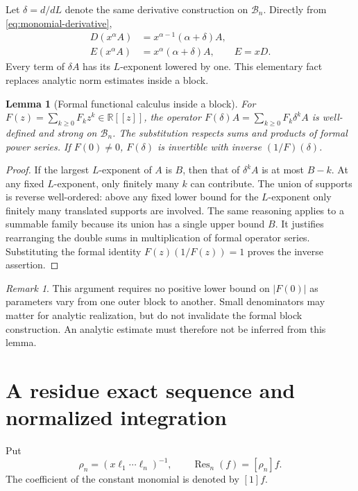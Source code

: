 \documentclass[11pt,a4paper]{article}
\numberwithin{equation}{section}
\newtheorem{lemma}[lemma]{Lemma}
\theoremstyle{definition}
\theoremstyle{remark}
\newtheorem{remark}[remark]{Remark}
\newcommand{\R}{\mathbb R}
\newcommand{\Res}{\operatorname{Res}}
\newcommand{\coef}[2]{[#1]#2}
\begin{document}
Let $\delta=d/dL$ denote the same derivative construction on $\mathcal B_n$. Directly from \eqref{eq:monomial-derivative},
\begin{align}
 D(x^\alpha A)&=x^{\alpha-1}(\alpha+\delta)A,\\
 E(x^\alpha A)&=x^\alpha(\alpha+\delta)A,
 \qquad E=xD.
 \label{eq:euler-block}
\end{align}
Every term of $\delta A$ has its $L$-exponent lowered by one. This elementary fact replaces analytic norm estimates inside a block.

\begin{lemma}[Formal functional calculus inside a block]
\label{lem:functional}
For $F(z)=\sum_{k\ge0}F_kz^k\in\R[[z]]$, the operator
$F(\delta)A=\sum_{k\ge0}F_k\delta^kA$ is well-defined and strong on $\mathcal B_n$. The substitution respects sums and products of formal power series. If $F(0)\ne0$, $F(\delta)$ is invertible with inverse $(1/F)(\delta)$.
\end{lemma}
\begin{proof}
If the largest $L$-exponent of $A$ is $B$, then that of $\delta^kA$ is at most $B-k$. At any fixed $L$-exponent, only finitely many $k$ can contribute. The union of supports is reverse well-ordered: above any fixed lower bound for the $L$-exponent only finitely many translated supports are involved. The same reasoning applies to a summable family because its union has a single upper bound $B$. It justifies rearranging the double sums in multiplication of formal operator series. Substituting the formal identity $F(z)(1/F(z))=1$ proves the inverse assertion.
\end{proof}

\begin{remark}
This argument requires no positive lower bound on $|F(0)|$ as parameters vary from one outer block to another. Small denominators may matter for analytic realization, but do not invalidate the formal block construction. An analytic estimate must therefore not be inferred from this lemma.
\end{remark}

\section{A residue exact sequence and normalized integration}
\label{sec:residue}
Put
\[
 \rho_n=(x\ell_1\cdots\ell_n)^{-1},\qquad
 \Res_n(f)=\coef{\rho_n}{f}.
\]
The coefficient of the constant monomial is denoted by $[1]f$.
\end{document}

